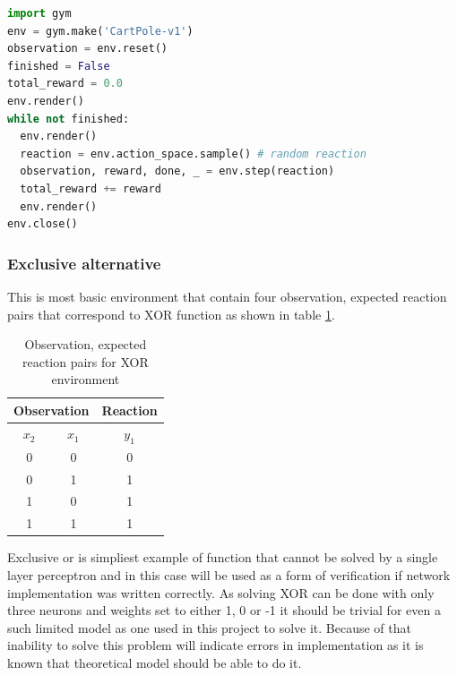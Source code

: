 \begin{lstlisting}[frame=single, language=Python, caption={A simple simulation in Gym}]
import gym
env = gym.make('CartPole-v1')
observation = env.reset()
finished = False
total_reward = 0.0
env.render()
while not finished:
  env.render()
  reaction = env.action_space.sample() # random reaction
  observation, reward, done, _ = env.step(reaction)
  total_reward += reward
  env.render()
env.close()
\end{lstlisting}

\FloatBarrier
\subsubsection{Exclusive alternative}
This is most basic environment that contain four observation, expected reaction pairs that 
correspond to XOR function as shown in table \ref{tab:xor-env}.
\begin{table}[htb] 
	\centering
	\caption{Observation, expected reaction pairs for XOR environment}
	\label{tab:xor-env}
	\begin{tabular}{ccc}
		\hline
		\hline
		 \multicolumn{2}{c}{Observation}& Reaction\\
		\hline
		$x_{2}$& $x_{1}$& $y_{1}$ \\
		\hline
		0& 0& 0\\
		0& 1& 1\\
		1& 0& 1\\
		1& 1& 1\\
		\hline
		\hline
	\end{tabular}
	\newline
\end{table}
Exclusive or is simpliest example of function that cannot be solved by a single layer perceptron
and in this case will be used as a form of verification if network implementation was written
correctly.
As solving XOR can be done with only three neurons and weights set to either 1, 0 or -1 it 
should be trivial for even a such limited model as one used in this project to solve it.
Because of that inability to solve this problem will indicate errors in implementation as it is
known that theoretical model should be able to do it.

\FloatBarrier
